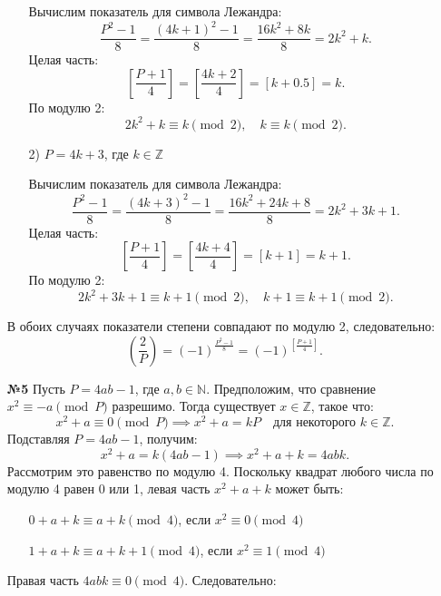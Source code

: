 \documentclass[a4paper]{article}
\begin{document}
\begin{enumerate}
\begin{enumerate}
        Вычислим показатель для символа Лежандра:
        \[
        \frac{P^2 - 1}{8} = \frac{(4k+1)^2 - 1}{8} = \frac{16k^2 + 8k}{8} = 2k^2 + k.
        \]
        Целая часть:
        \[
        \left[ \frac{P + 1}{4} \right] = \left[ \frac{4k + 2}{4} \right] = \left[ k + 0.5 \right] = k.
        \]
        По модулю 2:
        \[
        2k^2 + k \equiv k \pmod{2}, \quad k \equiv k \pmod{2}.
        \]

        \item[2)]\( P = 4k + 3 \), где \( k \in \mathbb{Z} \)
        
        Вычислим показатель для символа Лежандра:
        \[
        \frac{P^2 - 1}{8} = \frac{(4k+3)^2 - 1}{8} = \frac{16k^2 + 24k + 8}{8} = 2k^2 + 3k + 1.
        \]
        Целая часть:
        \[
        \left[ \frac{P + 1}{4} \right] = \left[ \frac{4k + 4}{4} \right] = \left[ k + 1 \right] = k + 1.
        \]
        По модулю 2:
        \[
        2k^2 + 3k + 1 \equiv k + 1 \pmod{2}, \quad k + 1 \equiv k + 1 \pmod{2}.
        \]
    \end{enumerate}

    В обоих случаях показатели степени совпадают по модулю 2, следовательно:
    \[
    \left( \frac{2}{P} \right) = (-1)^{\frac{P^2 - 1}{8}} = (-1)^{\left[ \frac{P + 1}{4} \right]}.
    \]

    \item[\textbf{№5}]
    Пусть \( P = 4ab - 1 \), где \( a, b \in \mathbb{N} \). Предположим, что сравнение \( x^2 \equiv -a \pmod{P} \) разрешимо. Тогда существует \( x \in \mathbb{Z} \), такое что:
    \[
    x^2 + a \equiv 0 \pmod{P} \implies x^2 + a = kP \quad \text{для некоторого } k \in \mathbb{Z}.
    \]
    Подставляя \( P = 4ab - 1 \), получим:
    \[
    x^2 + a = k(4ab - 1) \implies x^2 + a + k = 4abk.
    \]
    Рассмотрим это равенство по модулю 4. Поскольку квадрат любого числа по модулю 4 равен 0 или 1, левая часть \( x^2 + a + k \) может быть:
    \begin{enumerate}
        \item[]
        \( 0 + a + k \equiv a + k \pmod{4} \), если \( x^2 \equiv 0 \pmod{4} \)
        \item[]
        \( 1 + a + k \equiv a + k + 1 \pmod{4} \), если \( x^2 \equiv 1 \pmod{4} \)
    \end{enumerate}

    Правая часть \( 4abk \equiv 0 \pmod{4} \). Следовательно:


\end{enumerate}
\end{document}
